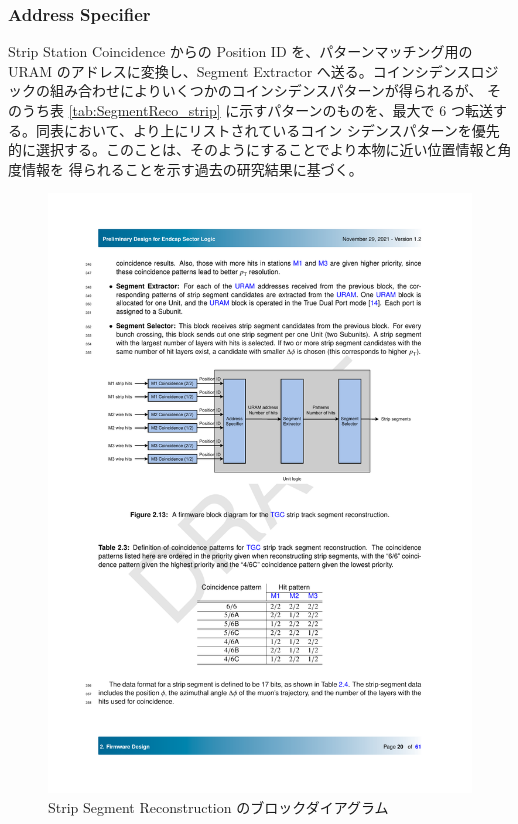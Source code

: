 \subsubsection*{Address Specifier}
Strip Station Coincidence からの Position ID を、パターンマッチング用の URAM のアドレスに変換し、Segment
Extractor へ送る。コインシデンスロジックの組み合わせによりいくつかのコインシデンスパターンが得られるが、 そのうち表 \ref{tab:SegmentReco_strip} に示すパターンのものを、最大で 6 つ転送する。同表において、より上にリストされているコイン シデンスパターンを優先的に選択する。このことは、そのようにすることでより本物に近い位置情報と角度情報を 得られることを示す過去の研究結果に基づく。

\begin{figure} 
\centering
\includegraphics[width=16cm]{fig/SL/SegReco_strip.pdf}
\caption[Strip Segment Reconstruction のブロックダイアグラム]{Strip Segment Reconstruction のブロックダイアグラム}
\label{SegReco_strip}
\end{figure}

